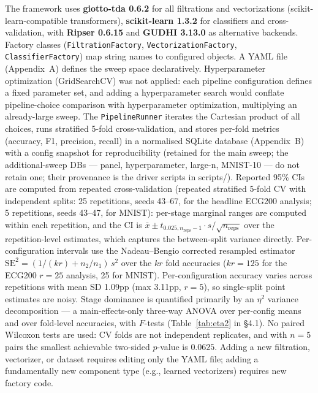 \documentclass[12pt, a4paper]{report}
\theoremstyle{definition}
\theoremstyle{plain}
\theoremstyle{remark}
\begin{document}
The framework uses \textbf{giotto-tda 0.6.2} \cite{tauzin2021} for
all filtrations and vectorizations (scikit-learn-compatible
transformers), \textbf{scikit-learn 1.3.2} for classifiers and
cross-validation, with \textbf{Ripser 0.6.15} \cite{bauer2021} and \textbf{GUDHI
3.13.0} \cite{maria2014} as alternative backends. Factory classes
(\texttt{FiltrationFactory}, \texttt{VectorizationFactory},
\texttt{ClassifierFactory}) map string names to configured objects.
A YAML file (Appendix~A) defines the sweep space declaratively.
Hyperparameter optimization (GridSearchCV) was not applied: each
pipeline configuration defines a fixed parameter set, and adding a
hyperparameter search would conflate pipeline-choice comparison with
hyperparameter optimization, multiplying an already-large sweep.
The \texttt{PipelineRunner} iterates the Cartesian product of all
choices, runs stratified 5-fold cross-validation, and stores
per-fold metrics (accuracy, F1, precision, recall) in a normalised
SQLite database (Appendix~B) with a config snapshot for
reproducibility (retained for the main sweep; the additional-sweep
DBs --- panel, hyperparameter, large-n, MNIST-10 --- do not
retain one; their provenance is the driver scripts in
scripts/). Reported 95\% CIs are computed from repeated
cross-validation (repeated stratified 5-fold CV with independent
splits: 25 repetitions, seeds 43--67, for the headline ECG200
analysis; 5 repetitions, seeds 43--47, for MNIST): per-stage
marginal ranges are computed within each repetition, and the CI is
$\bar{x} \pm t_{0.025, n_{\text{reps}}-1} \cdot s /
\sqrt{n_{\text{reps}}}$ over the repetition-level estimates,
which captures the between-split variance directly.
Per-configuration intervals use the Nadeau--Bengio corrected
resampled estimator $\mathrm{SE}^2 = (1/(kr) + n_2/n_1)\, s^2$ over
the $kr$ fold accuracies ($kr = 125$ for the ECG200 $r{=}25$ analysis,
25 for MNIST). Per-configuration accuracy varies
across repetitions with mean SD 1.09pp (max 3.11pp, $r{=}5$), so single-split
point estimates are noisy. Stage dominance is quantified primarily
by an $\eta^2$ variance decomposition --- a main-effects-only
three-way ANOVA over per-config means and over fold-level
accuracies, with $F$-tests (Table~\ref{tab:eta2} in \S4.1). No
paired Wilcoxon tests are used: CV folds are not independent
replicates, and with $n = 5$ pairs the smallest achievable two-sided
$p$-value is $0.0625$. Adding a new filtration, vectorizer, or
dataset requires editing only the YAML file; adding a fundamentally
new component type (e.g., learned vectorizers) requires new factory
code.
\end{document}
